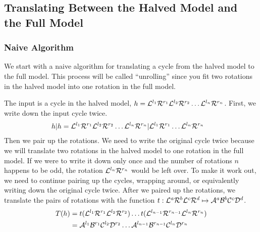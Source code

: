 \subsection{Translating Between the Halved Model and the Full Model}

\subsubsection{Naive Algorithm}

We start with a naive algorithm for translating a cycle from the halved model to the full model.
This process will be called ``unrolling'' since you fit two rotations in the halved model into one rotation in the full model.

The input is a cycle in the halved model, $h = \mathcal{L}^{l_1}\mathcal{R}^{r_1}\mathcal{L}^{l_2}\mathcal{R}^{r_2} \ldots \mathcal{L}^{l_n}\mathcal{R}^{r_n}$.
First, we write down the input cycle twice.
\begin{align}
	h|h & = \mathcal{L}^{l_1}\mathcal{R}^{r_1}\mathcal{L}^{l_2}\mathcal{R}^{r_2} \ldots \mathcal{L}^{l_n}\mathcal{R}^{r_n} | \mathcal{L}^{l_1}\mathcal{R}^{r_1} \ldots \mathcal{L}^{l_n}\mathcal{R}^{r_n}
\end{align}
Then we pair up the rotations.
We need to write the original cycle twice because we will translate two rotations in the halved model to one rotation in the full model.
If we were to write it down only once and the number of rotations $n$ happens to be odd, the rotation $\mathcal{L}^{l_n}\mathcal{R}^{r_n}$ would be left over.
To make it work out, we need to continue pairing up the cycles, wrapping around, or equivalently writing down the original cycle twice.
After we paired up the rotations, we translate the pairs of rotations with the function $t: \mathcal{L}^a\mathcal{R}^b\mathcal{L}^c\mathcal{R}^d \mapsto \mathcal{A}^a\mathcal{B}^b\mathcal{C}^c\mathcal{D}^d$.
\begin{subequations}
	\begin{align}
		T(h) & = t(\mathcal{L}^{l_1}\mathcal{R}^{r_1}\mathcal{L}^{l_2}\mathcal{R}^{r_2}) \dots t(\mathcal{L}^{l_{n-1}}\mathcal{R}^{r_{n-1}}\mathcal{L}^{l_n}\mathcal{R}^{r_n}) \\
		     & = \mathcal{A}^{l_1}\mathcal{B}^{r_1}\mathcal{C}^{l_2}\mathcal{D}^{r_2} \dots \mathcal{A}^{l_{n-1}}\mathcal{B}^{r_{n-1}}\mathcal{C}^{l_n}\mathcal{D}^{r_n}
	\end{align}
\end{subequations}

